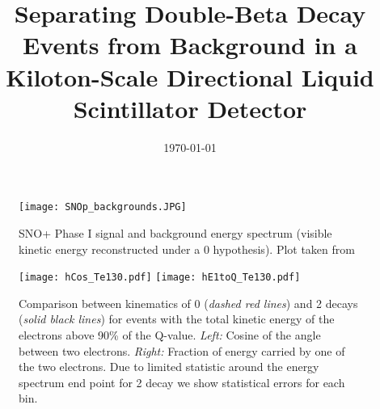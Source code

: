 



\graphicspath{{plots/}}

\linenumbers
{}

\title{Separating Double-Beta Decay Events from Background in a Kiloton-Scale Directional Liquid Scintillator Detector}


\begin{abstract}

\end{abstract}

\date{\today}

\maketitle

\newpage
\tableofcontents
\newpage

\linenumbers\relax %



\begin{figure}[ht]
  \centering
  \texttt{[image: SNOp\_backgrounds.JPG]}
  \caption{SNO+ Phase I signal and background energy spectrum (visible
    kinetic energy reconstructed under a 0{\nbb} hypothesis). Plot                                                                                                                   
    taken from~\cite{SNOp_paper}}
  \label{fig:SNOp_bkgs}
\end{figure}

\begin{figure*}[ht]
  \centering
  \texttt{[image: hCos\_Te130.pdf]}
  \texttt{[image: hE1toQ\_Te130.pdf]}
  \caption{Comparison between kinematics of 0{\nbb} (\emph{dashed red
      lines}) and 2{\nbb} decays (\emph{solid black lines}) for events
    with the total kinetic energy of the electrons above 90\% of the
    Q-value. \emph{Left:} Cosine of the angle between two
    electrons. \emph{Right:} Fraction of energy carried by one of the
    two electrons. Due to limited statistic around the energy spectrum
    end point for 2{\nbb} decay we show statistical errors for each
    bin.}
  \label{fig:Kinematics}
\end{figure*}


\clearpage %

